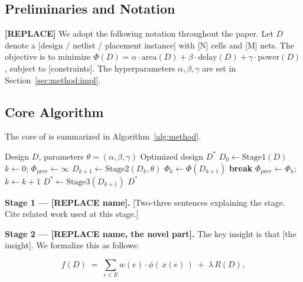 \subsection{Preliminaries and Notation}
\label{sec:method:prelim}

\textbf{[REPLACE]} We adopt the following notation throughout the paper.
Let \(D\) denote a [design / netlist / placement instance] with [N] cells
and [M] nets. The objective is to minimize
\(\Phi(D) = \alpha \cdot \mathrm{area}(D) + \beta \cdot \mathrm{delay}(D)
+ \gamma \cdot \mathrm{power}(D)\), subject to [constraints]. The
hyperparameters \(\alpha, \beta, \gamma\) are set in
Section~\ref{sec:method:impl}.

\subsection{Core Algorithm}
\label{sec:method:core}

The core of \method{} is summarized in Algorithm~\ref{alg:method}.

\begin{algorithm}[!t]
\caption{\method{}: high-level procedure.}
\label{alg:method}
\begin{algorithmic}[1]
\REQUIRE Design \(D\), parameters \(\theta = (\alpha,\beta,\gamma)\)
\ENSURE Optimized design \(D^*\)
\STATE \(D_0 \leftarrow \text{Stage1}(D)\)
\STATE \(k \leftarrow 0\); \(\Phi_{\text{prev}} \leftarrow \infty\)
    \STATE \(D_{k+1} \leftarrow \text{Stage2}(D_k, \theta)\)
    \STATE \(\Phi_k \leftarrow \Phi(D_{k+1})\)
        \STATE \textbf{break}
    \ENDIF
    \STATE \(\Phi_{\text{prev}} \leftarrow \Phi_k\); \(k \leftarrow k+1\)
\ENDWHILE
\STATE \(D^* \leftarrow \text{Stage3}(D_{k+1})\)
\RETURN \(D^*\)
\end{algorithmic}
\end{algorithm}

\textbf{Stage 1 — [REPLACE name].} [Two-three sentences explaining the
stage. Cite related work used at this stage.]

\textbf{Stage 2 — [REPLACE name, the novel part].} The key insight is
that [the insight]. We formalize this as follows:

\begin{equation}
\label{eq:novel}
f(D) \;=\; \sum_{e \in E} w(e) \cdot \phi\!\left(\, x(e) \,\right)
       \;+\; \lambda \, R(D),
\end{equation}

